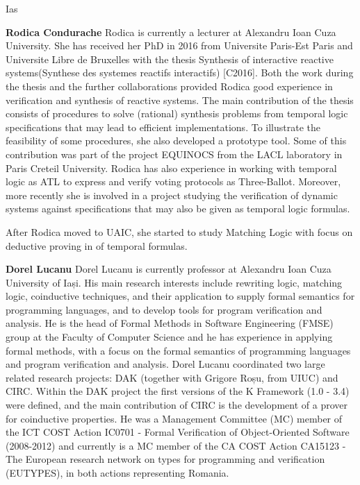 \begin{sitedescription}{Ias}
\begin{compactitem}
\item{\bf Rodica Condurache}
Rodica is currently a lecturer at Alexandru Ioan Cuza University. She has received her PhD in 2016 from Universite Paris-Est Paris and Universite Libre de Bruxelles with the thesis Synthesis of interactive reactive systems(Synthese des systemes reactifs interactifs) [C2016]. Both the work during the thesis and the further collaborations provided Rodica good experience in verification and synthesis of reactive systems. 
The main contribution of the thesis consists of procedures to solve (rational) synthesis problems from temporal logic specifications that may lead to efficient implementations. To illustrate the feasibility of some procedures, she also developed a prototype tool. Some of this contribution was part of the project EQUINOCS from the LACL laboratory in Paris Creteil University.
Rodica has also experience in working with temporal logic as ATL to express and verify voting protocols as Three-Ballot. Moreover, more recently she is involved in a project studying the verification of dynamic systems against specifications that may also be given as temporal logic formulas.

After Rodica moved to UAIC, she started to study Matching Logic with focus on deductive proving in of temporal formulas.

\item{\bf Dorel Lucanu}
Dorel Lucanu is currently professor at Alexandru Ioan Cuza University of Iași. His main research interests include rewriting logic, matching logic, coinductive techniques, and their application to supply formal semantics for programming languages, and to develop tools for program verification and analysis. He is the head of Formal Methods in Software Engineering (FMSE) group at the Faculty of Computer Science and he has experience in applying formal methods, with a focus on the formal semantics of programming languages and program verification and analysis. 
Dorel Lucanu coordinated two large related research projects: DAK (together with Grigore Roșu, from UIUC) and CIRC. Within the DAK project the first versions of the K Framework (1.0 - 3.4) were defined, and the main contribution of CIRC is the development of a prover for coinductive properties.
He was a Management Committee (MC) member of the ICT COST Action IC0701 - Formal Verification of Object-Oriented Software (2008-2012) and currently is a MC member of the CA COST Action CA15123 - The European research network on types for programming and verification (EUTYPES), in both actions representing Romania.


\end{compactitem}

\end{sitedescription}

